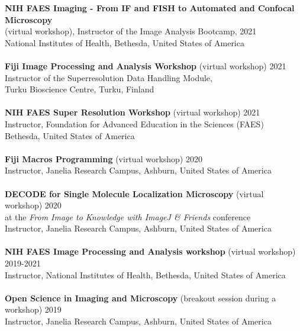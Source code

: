 \documentclass[margin,line]{res}
\begin{document}
\begin{resume}
{\bf  NIH FAES Imaging - From IF and FISH to Automated and Confocal Microscopy} \\(virtual workshop), Instructor of the Image Analysis Bootcamp,  \hfill 2021\\
 National Institutes of Health, Bethesda, United States of America\\
\vspace*{-3mm}\\
{\bf  Fiji Image Processing and Analysis Workshop} (virtual workshop)  \hfill 2021\\
Instructor of the Superresolution Data Handling Module, \\Turku Bioscience Centre, Turku, Finland\\
\vspace*{-3mm}\\
{\bf  NIH FAES Super Resolution Workshop} (virtual workshop)  \hfill 2021\\
Instructor, Foundation for Advanced Education in the Sciences (FAES)\\
Bethesda, United States of America\\
\vspace*{-3mm}\\
{\bf Fiji Macros Programming} (virtual workshop)  \hfill 2020\\
Instructor, Janelia Research Campus, Ashburn, United States of America\\
\vspace*{-3mm}\\
{\bf DECODE for Single Molecule Localization Microscopy} (virtual workshop)  \hfill 2020\\
at the \emph{From Image to Knowledge with ImageJ \& Friends} conference\\
Instructor, Janelia Research Campus, Ashburn, United States of America\\
\vspace*{-3mm}\\
{\bf  NIH FAES Image Processing and Analysis workshop} (virtual workshop)  \hfill 2019-2021\\
 Instructor, National Institutes of Health, Bethesda, United States of America\\
\vspace*{-3mm}\\
{\bf  Open Science in Imaging and Microscopy} (breakout session during a workshop)  \hfill 2019\\
Instructor, Janelia Research Campus, Ashburn, United States of America\\

\end{resume}
\end{document}
